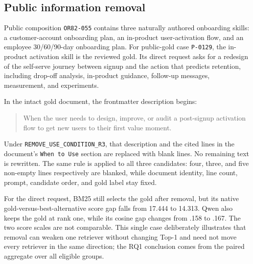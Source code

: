 \begin{singlespace}
\subsection{Public information removal}

Public composition \texttt{OR82-055} contains three naturally authored onboarding skills: a customer-account onboarding plan, an in-product user-activation flow, and an employee 30/60/90-day onboarding plan. For public-gold case \texttt{P-0129}, the in-product activation skill is the reviewed gold. Its direct request asks for a redesign of the self-serve journey between signup and the action that predicts retention, including drop-off analysis, in-product guidance, follow-up messages, measurement, and experiments.

In the intact gold document, the frontmatter description begins:

\begin{quote}
When the user needs to design, improve, or audit a post-signup activation flow to get new users to their first value moment.
\end{quote}

Under \texttt{REMOVE\_USE\_CONDITION\_R3}, that description and the cited lines in the document's \texttt{When to Use} section are replaced with blank lines. No remaining text is rewritten. The same rule is applied to all three candidates: four, three, and five non-empty lines respectively are blanked, while document identity, line count, prompt, candidate order, and gold label stay fixed.

For the direct request, BM25 still selects the gold after removal, but its native gold-versus-best-alternative score gap falls from 17.444 to 14.313. Qwen also keeps the gold at rank one, while its cosine gap changes from .158 to .167. The two score scales are not comparable. This single case deliberately illustrates that removal can weaken one retriever without changing Top-1 and need not move every retriever in the same direction; the RQ1 conclusion comes from the paired aggregate over all eligible groups.
\end{singlespace}
